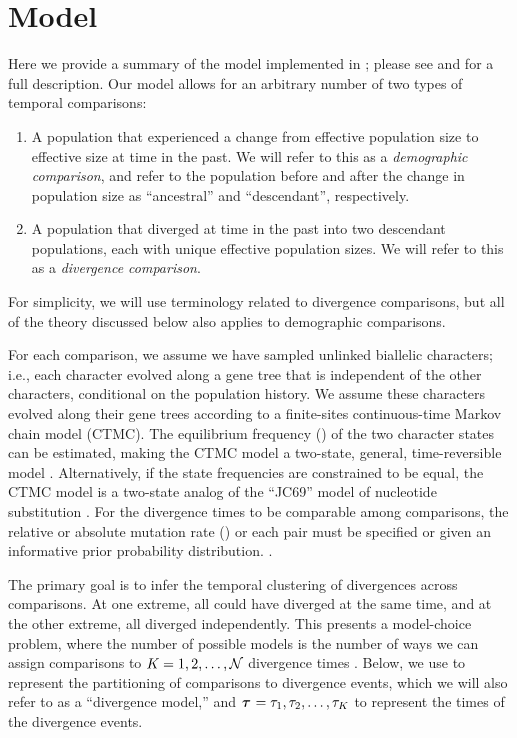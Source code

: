 \documentclass[letterpaper,12pt]{article}
\begin{document}
\section{Model}

Here we provide a summary of the model implemented in \ecoevolity; please see
\citet{Oaks2018ecoevolity} and \citet{Oaks2019codemog} for a full description.
Our model allows for an arbitrary number of two types of temporal comparisons:
\begin{enumerate}
    \item A population that experienced a change from effective population size
        \epopsize[\rootpopindex]
        to effective size
        \epopsize[\descendantpopindex{}]
        at time \comparisonetime in the past.
        We will refer to this as a \emph{demographic comparison},
        and refer to the population before and after the change in population
        size as ``ancestral'' and ``descendant'', respectively.
    \item A population that diverged at time \comparisonetime in the past into
        two descendant populations, each with unique effective population
        sizes.
        We will refer to this as a \emph{divergence comparison}.
\end{enumerate}
For simplicity, we will use terminology related to divergence comparisons, but
all of the theory discussed below also applies to demographic comparisons.

For each comparison, we assume we have sampled unlinked biallelic characters;
i.e., each character evolved along a gene tree that is independent of the
other characters, conditional on the population history.
We assume these characters evolved along their gene trees according to a
finite-sites continuous-time Markov chain model (CTMC).
The equilibrium frequency (\gfreq) of the two character states can be
estimated, making the CTMC model a two-state, general, time-reversible model
\citep{Tavare1986}.
Alternatively, if the state frequencies are constrained to be equal, the CTMC
model is a two-state analog of the ``JC69'' model of nucleotide substitution
\citep{JC1969}.
For the divergence times to be comparable among comparisons, the relative or
absolute mutation rate (\murate) or each pair must be specified or given an
informative prior probability distribution.
\citep{Oaks2018ecoevolity,Oaks2019codemog}.

The primary goal is to infer the temporal clustering of divergences across
\ncomparisons comparisons.
At one extreme, all \ncomparisons could have diverged at the same time,
and at the other extreme, all \ncomparisons diverged independently.
This presents a model-choice problem, where the number of possible models
is the number of ways we can assign \ncomparisons comparisons to
$\nevents = 1, 2,  \ldots, \ncomparisons$ divergence times
\citep[the Bell number;][]{Bell1934}.
Below, we use \etimesets to represent the partitioning of comparisons to
divergence events, which we will also refer to as a ``divergence model,'' and
$\etimes = \etime[1], \etime[2], \ldots, \etime[\nevents]$
to represent the times of the \nevents divergence events.
\end{document}
